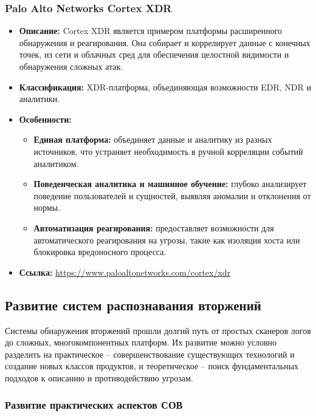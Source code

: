 \subsubsection{Palo Alto Networks Cortex XDR}
\begin{itemize}
		\item \textbf{Описание:} Cortex XDR является примером платформы расширенного обнаружения и реагирования. Она собирает и коррелирует данные с конечных точек, из сети и облачных сред для обеспечения целостной видимости и обнаружения сложных атак.
    \item \textbf{Классификация:} XDR-платформа, объединяющая возможности EDR, NDR и аналитики.
    \item \textbf{Особенности:}
    \begin{itemize}
        \item \textbf{Единая платформа:} объединяет данные и аналитику из разных источников, что устраняет необходимость в ручной корреляции событий аналитиком.
        \item \textbf{Поведенческая аналитика и машинное обучение:} глубоко анализирует поведение пользователей и сущностей, выявляя аномалии и отклонения от нормы.
        \item \textbf{Автоматизация реагирования:} предоставляет возможности для автоматического реагирования на угрозы, такие как изоляция хоста или блокировка вредоносного процесса.
    \end{itemize}
    \item \textbf{Ссылка:} \url{https://www.paloaltonetworks.com/cortex/xdr}
\end{itemize}


\subsection{Развитие систем распознавания вторжений}

Системы обнаружения вторжений прошли долгий путь от простых сканеров логов до сложных, многокомпонентных платформ. Их развитие можно условно разделить на практическое -- совершенствование существующих технологий и создание новых классов продуктов, и теоретическое -- поиск фундаментальных подходов к описанию и противодействию угрозам.

\subsubsection{Развитие практических аспектов СОВ}

